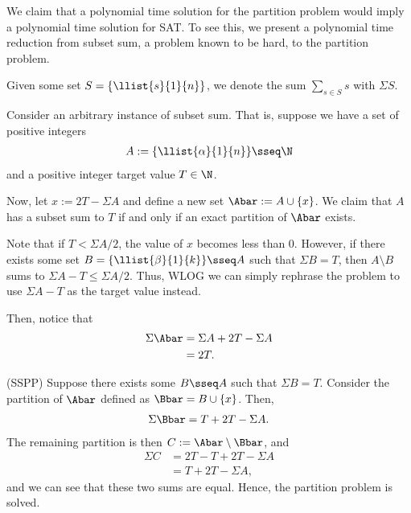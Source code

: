 \documentclass{article}
\begin{document}
\begin{solution}
We claim that a polynomial time solution for the partition problem would imply a polynomial time solution for SAT.
To see this, we present a polynomial time reduction from subset sum, a problem known to be hard, to the partition problem.

\begin{notation}
Given some set \( S = \{\llist{s}{1}{n}\} \), we denote the sum \( \sum\limits_{s\in S}s \) with  \( \Sigma S \).
\end{notation}

Consider an arbitrary instance of subset sum.
That is, suppose we have a set of positive integers \begin{align*}
  A := \{\llist{\alpha}{1}{n}\} \sseq \N
\end{align*}
and a positive integer target value \( T\in \N \).

Now, let \( x := 2T-\Sigma A \) and define a new set \( \Abar := A\cup \{x\} \).
We claim that \( A \) has a subset sum to \( T \) if and only if an exact partition of \( \Abar \) exists.

Note that if \( T < \Sigma A/{2} \), the value of \( x \) becomes less than 0.
However, if there exists some set \( B = \{\llist{\beta}{1}{k}\}\sseq A \) such that \( \Sigma B = T \), then \( A\setminus B \) sums to \( \Sigma A - T \leq \Sigma A/{2} \).
Thus, WLOG we can simply rephrase the problem to use \( \Sigma A - T \) as the target value instead.

Then, notice that \begin{align*}
  \Sigma \Abar &= \Sigma A + 2T-\Sigma A \\
  &= 2T.
\end{align*}
\begin{subproof}[Correctness.] (SS\imp PP)
  Suppose there exists some \( B\sseq A \) such that \( \Sigma B = T \).
  Consider the partition of \( \Abar \) defined as \( \Bbar = B\cup \{x\} \).
  Then, \begin{align*}
    \Sigma \Bbar= T + 2T-\Sigma A.
  \end{align*}
  The remaining partition is then \( C := \Abar\setminus \Bbar \), and \begin{align*}
  \Sigma C &= 2T- T + 2T-\Sigma A \\
  &= T + 2T-\Sigma A,
  \end{align*}
  and we can see that these two sums are equal.
  Hence, the partition problem is solved.


\end{subproof}
\end{solution}
\end{document}

